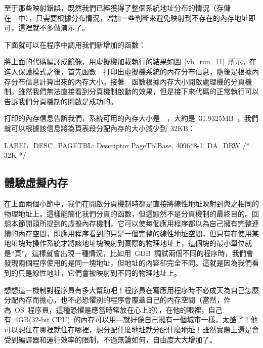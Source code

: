 至于那些映射錯誤，既然我們已經獲得了整個系統地址分布的情況（存儲在~~中），只需要根據分布情況，增加一些判斷來避免映射到不存在的內存地址即可，這裡就不多做演示了。

下面就可以在程序中調用我們新增加的函數：


將上面的代碼編譯成鏡像，用虛擬機加載執行的結果如圖~\ref{vb_run_11}~所示。在進入保護模式之後，首先函數~~打印出虛擬機系統的內存分布信息，隨後是根據內存分布信息計算出來的內存大小。接著~~函數根據內存大小開啟處理機的分頁機制。雖然我們無法直接看到分頁機制啟動的效果，但是接下來代碼的正常執行可以告訴我們分頁機制的開啟是成功的。


打印的內存信息告訴我們，系統可用的內存大小是~~，大約是~31.9325MB~，我們就可以根據該信息將為頁表段分配內存的大小減少到~32KB：

\begin{Command}
LABEL_DESC_PAGETBL: Descriptor PageTblBase,        4096*8-1, DA_DRW /* 32K */
\end{Command}

\subsection{體驗虛擬內存}

在上面兩個小節中，我們在開啟分頁機制時都是直接將線性地址映射到與之相同的物理地址上。這樣能簡化我們分頁的函數，但這顯然不是分頁機制的最終目的。回想本節開頭所提到的虛擬內存機制，它可以使每個應用程序都以為自己擁有完整連續的內存空間，即應用程序看到的只是一個完整的線性地址空間，但只有在使用某地址塊時操作系統才將該地址塊映射到實際的物理地址上，這個塊的最小單位就是“頁”。這樣就會出現一種情況，比如用~GDB~調試兩個不同的程序時，我們會發現兩個程序使用的是同一塊地址，但地址的內容卻完全不同。這就是因為我們看到的只是線性地址，它們會被映射到不同的物理地址上。

想想這一機制對程序員有多大幫助吧！程序員在寫應用程序時不必成天為自己怎麼分配內存而擔心，也不必恐懼別的程序會覆蓋自己的內存空間（當然，作為~OS~程序員，這種恐懼是應當時常放在心上的），在他的眼裡，自己有~4GB(32-bit CPU)~的內存可以用---就好像自己擁有一個城市一樣，太酷了！他可以想住在哪裡就住在哪裡，想分配什麼地址就分配什麼地址！雖然實際上還是會受到編譯器和運行效率的限制，不過無論如何，自由度大大增加了。

